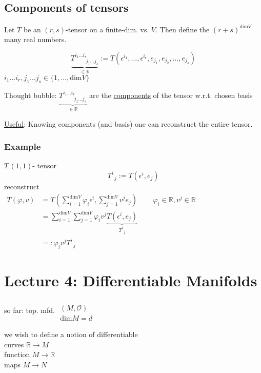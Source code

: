\documentclass[10pt, twoside]{amsart}
\begin{document}
\begin{multicols*}{2}
\subsection{Components of tensors}

Let $T$ be an $(r,s)$-tensor on a finite-dim. vs. $V$.  Then define the $(r+s)^{\text{dim}V}$ many real numbers.  

\[
\underbrace{T^{i_1 \dots i_r}_{ \qquad \, j_1 \dots j_s} }_{\in \mathbb{R}} := T(\epsilon^{i_1}, \dots , \epsilon^{i_r} , e_{j_1} , e_{j_2}, \dots, e_{j_s} )
\]
$i_1 \dots i_r, j_1 \dots j_s \in \lbrace 1 , \dots , \text{dim}V \rbrace$

Thought bubble: $\underbrace{T^{i_1 \dots i_r}_{ \qquad \, j_1 \dots j_s} }_{\in \mathbb{R}}$ are the \underline{components} of the tensor w.r.t. chosen basis

\underline{Useful}: Knowing components (and basis) one can reconstruct the entire tensor.

\subsubsection*{Example} $T \, (1,1)$- tensor
\[
T^i_{ \; \; j} := T(\epsilon^i, e_j)
\]
reconstruct \\
$\begin{aligned} 
T(\varphi,v) & =T(\sum_{i=1}^{\text{dim}{V}}\varphi_i \epsilon^i, \sum_{j=1}^{\text{dim}V} v^j e_j)   \qquad \, \varphi_i \in \mathbb{R}, v^j \in \mathbb{R} \\ 
&  = \sum_{i=1}^{\text{dim}V} \sum_{j=1}^{\text{dim}{V}} \varphi_i v^j \underbrace{ T(\epsilon^i, e_j) }_{T^i_{ \; \; j}} \\
  & =: \varphi_i v^j T^i_{ \; \; j}
\end{aligned}$







\section{Lecture 4: Differentiable Manifolds}

so far: top. mfd. $\begin{gathered}  \quad \\ 
  (M,\mathcal{O}) \\
  \text{dim}M = d \end{gathered}$

we wish to define a notion of differentiable  \\
\phantom{ \quad \quad \, } curves $\mathbb{R} \to M$ \\
\phantom{ \quad \quad \, } function $M \to \mathbb{R}$ \\
\phantom{ \quad \quad \, } maps $M \to N$


\end{multicols*}
\end{document}
